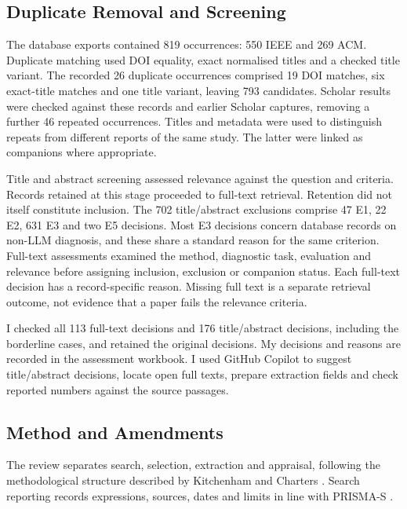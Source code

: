 \subsection{Duplicate Removal and Screening}

The database exports contained 819 occurrences: 550 IEEE and 269 ACM.
Duplicate matching used DOI equality, exact normalised titles and a checked
title variant. The recorded 26 duplicate occurrences comprised 19 DOI
matches, six exact-title matches and one title variant, leaving 793
candidates. Scholar results were checked against these records and earlier
Scholar captures, removing a further 46 repeated occurrences. Titles and
metadata were used to distinguish repeats from different reports of the
same study. The latter were linked as companions where appropriate.

Title and abstract screening assessed relevance against the question and
criteria. Records retained at this stage proceeded to full-text retrieval.
Retention did not itself constitute inclusion. The 702 title/abstract
exclusions comprise 47 E1, 22 E2, 631 E3 and two E5 decisions. Most E3
decisions concern database records on non-LLM diagnosis, and these share a
standard reason for the same criterion. Full-text assessments examined the
method, diagnostic task, evaluation and relevance before assigning
inclusion, exclusion or companion status. Each full-text decision has a
record-specific reason. Missing full text is a separate retrieval outcome,
not evidence that a paper fails the relevance criteria.

I checked all 113 full-text decisions and 176 title/abstract decisions,
including the borderline cases, and retained the original decisions.
My decisions and reasons are recorded in the assessment workbook.
I used GitHub Copilot to suggest title/abstract decisions, locate open
full texts, prepare extraction fields and check reported numbers against
the source passages.

\subsection{Method and Amendments}

The review separates search, selection, extraction and appraisal, following
the methodological structure described by Kitchenham and Charters
\parencite{kitchenham2007guidelines}. Search reporting records expressions,
sources, dates and limits in line with PRISMA-S
\parencite{rethlefsen2021prismas}.

